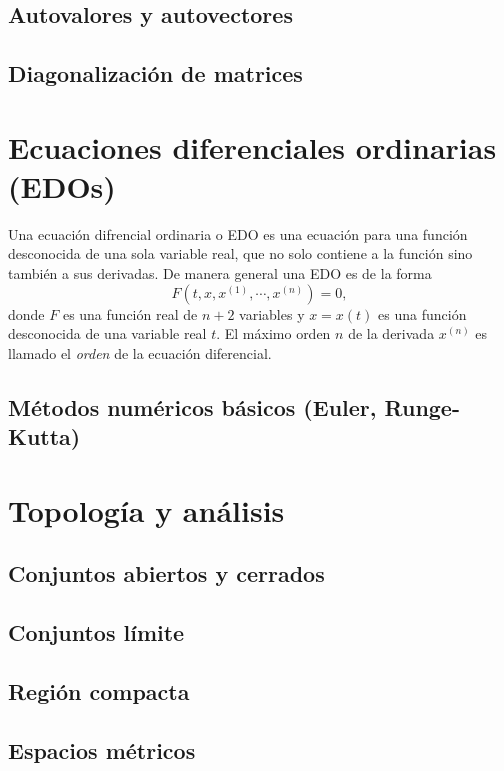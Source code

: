     \subsection{Autovalores y autovectores}
    \subsection{Diagonalización de matrices}
    
    \section{Ecuaciones diferenciales ordinarias (EDOs)}
    Una ecuación difrencial ordinaria o EDO es una ecuación para una función desconocida de una sola variable real, que no solo contiene a la función sino también a sus derivadas. De manera general una EDO es de la forma
    \begin{equation*}
    	F(t, x, x^{(1)}, \cdots, x^{(n)}) = 0,
    	\label{eq: generalFormEDO}
    \end{equation*}
    donde $F$ es una función real de $n+2$ variables y $x = x(t)$ es una función desconocida de una variable real $t$. El máximo orden $n$ de la derivada $x^{(n)}$ es llamado el \textit{orden} de la ecuación diferencial.
    \subsection{Métodos numéricos básicos (Euler, Runge-Kutta)}
    
    \section{Topología y análisis}
    \subsection{Conjuntos abiertos y cerrados}
    \subsection{Conjuntos límite}
    \subsection{Región compacta}
    \subsection{Espacios métricos}
